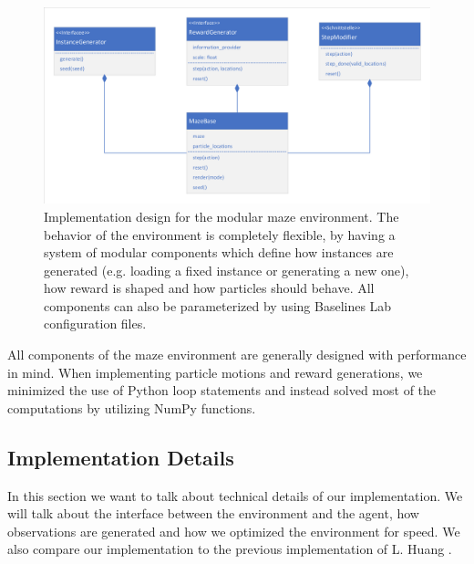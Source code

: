 \begin{figure}[ht]
    
    \begin{center}
        \includegraphics[clip, trim=10px 10px 10px 10px, width=0.9\columnwidth]{figures/implementation/maze_base_design.pdf}
    \end{center}
    
    \caption[Implementation Design for the Maze Environment]{Implementation design for the modular maze environment. The behavior of the environment is completely flexible, by having a system of modular components which define how instances are generated (e.g. loading a fixed instance or generating a new one), how reward is shaped and how particles should behave. All components can also be parameterized by using Baselines Lab configuration files.}
    \label{fig:MazeBaseDesign}
  \end{figure}

All components of the maze environment are generally designed with performance in mind. When implementing particle motions and reward generations, we minimized the use of Python loop statements and instead solved most of the computations by utilizing NumPy \cite{oliphant2006guide} functions.

\subsection{Implementation Details} \label{sec:MazeImplementationDetails}
In this section we want to talk about technical details of our implementation. We will talk about the interface between the environment and the agent, how observations are generated and how we optimized the environment for speed. We also compare our implementation to the previous implementation of L. Huang \cite{huangMazeGithub}.

